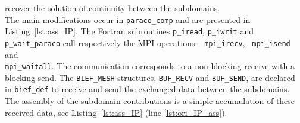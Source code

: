 \begin{enumerate}
recover the solution of continuity between the subdomains.
\\
%
The main modifications occur in \texttt{paraco\_comp} and are presented in Listing~\ref{lst:ass_IP}.
The Fortran subroutines \texttt{p\_iread}, \texttt{p\_iwrit} and  \texttt{p\_wait\_paraco}
call respectively the MPI operations:
\texttt{ mpi\_irecv}, \texttt{ mpi\_isend} and \\ \texttt{mpi\_waitall}.
The communication corresponds to a non-blocking receive
with a blocking send.
The \texttt{BIEF\_MESH} structures, \texttt{BUF\_RECV} and \texttt{BUF\_SEND},
are declared in \texttt{bief\_def} to receive and send the
exchanged data between the subdomains.
The assembly of the subdomain contributions
is a simple accumulation of these received data,
see Listing~\ref{lst:ass_IP} (line \ref{lst:ori_IP_ass}).


\end{enumerate}
